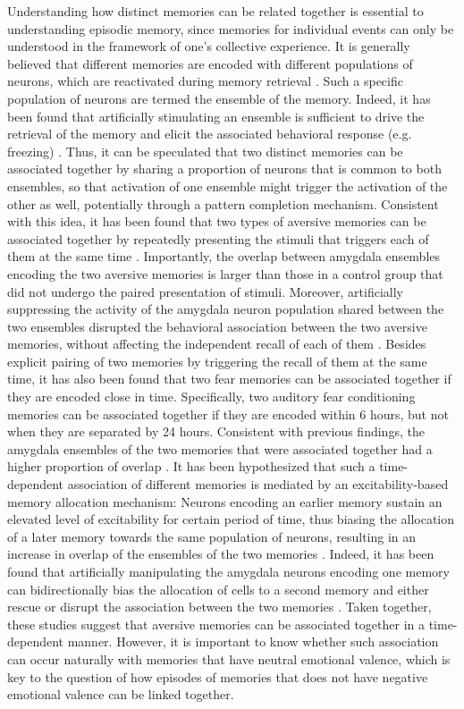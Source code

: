 \documentclass[master.tex]{subfiles}
\begin{document}
Understanding how distinct memories can be related together is essential to
understanding episodic memory, since memories for individual events can only be
understood in the framework of one's collective experience. It is generally
believed that different memories are encoded with different populations of
neurons, which are reactivated during memory retrieval
\cite{tayler_reactivation_2013}. Such a specific population of neurons are
termed the ensemble of the memory. Indeed, it has been found that artificially
stimulating an ensemble is sufficient to drive the retrieval of the memory and
elicit the associated behavioral response (e.g. freezing)
\cite{ramirez_creating_2013}. Thus, it can be speculated that two distinct
memories can be associated together by sharing a proportion of neurons that is
common to both ensembles, so that activation of one ensemble might trigger the
activation of the other as well, potentially through a pattern completion
mechanism. Consistent with this idea, it has been found that two types of
aversive memories can be associated together by repeatedly presenting the
stimuli that triggers each of them at the same time
\cite{yokose_overlapping_2017}. Importantly, the overlap between amygdala
ensembles encoding the two aversive memories is larger than those in a control
group that did not undergo the paired presentation of stimuli. Moreover,
artificially suppressing the activity of the amygdala neuron population shared
between the two ensembles disrupted the behavioral association between the two
aversive memories, without affecting the independent recall of each of them
\cite{yokose_overlapping_2017}. Besides explicit pairing of two memories by
triggering the recall of them at the same time, it has also been found that two
fear memories can be associated together if they are encoded close in time.
Specifically, two auditory fear conditioning memories can be associated together
if they are encoded within 6 hours, but not when they are separated by 24 hours.
Consistent with previous findings, the amygdala ensembles of the two memories
that were associated together had a higher proportion of overlap
\cite{rashid_competition_2016}. It has been hypothesized that such a
time-dependent association of different memories is mediated by an
excitability-based memory allocation mechanism: Neurons encoding an earlier
memory sustain an elevated level of excitability for certain period of time,
thus biasing the allocation of a later memory towards the same population of
neurons, resulting in an increase in overlap of the ensembles of the two
memories \cite{lisman_memory_2018, yiu_neurons_2014, zhou_creb_2009}. Indeed, it
has been found that artificially manipulating the amygdala neurons encoding one
memory can bidirectionally bias the allocation of cells to a second memory and
either rescue or disrupt the association between the two memories
\cite{rashid_competition_2016}. Taken together, these studies suggest that
aversive memories can be associated together in a time-dependent manner.
However, it is important to know whether such association can occur naturally
with memories that have neutral emotional valence, which is key to the question
of how episodes of memories that does not have negative emotional valence can be
linked together.
\end{document}
